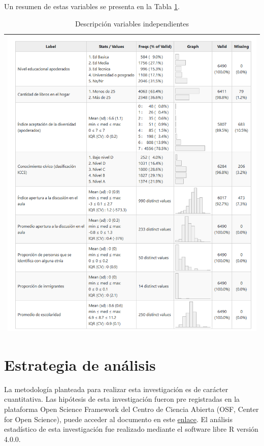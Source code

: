 \documentclass[12pt,twoside]{templates/facsothesis}
\begin{document}
Un resumen de estas variables se presenta en la Tabla \ref{tab:desc02}.

\begin{longtable}[]{@{}l@{}}
\caption{\label{tab:desc02}Descripción variables independientes}\tabularnewline
\toprule()
\endhead
\includegraphics{IPO/output/tables/desc02.png} \\
\bottomrule()
\end{longtable}

\hypertarget{estrategia-de-anuxe1lisis}{%
\section{Estrategia de análisis}\label{estrategia-de-anuxe1lisis}}

La metodología planteada para realizar esta investigación es de carácter cuantitativa. Las hipótesis de esta investigación fueron pre registradas en la plataforma Open Science Framework del Centro de Ciencia Abierta (OSF, Center for Open Science), puede acceder al documento en este \href{https://doi.org/10.17605/OSF.IO/URPZQ}{enlace}. El análisis estadístico de esta investigación fue realizado mediante el software libre R versión 4.0.0.
\end{document}
